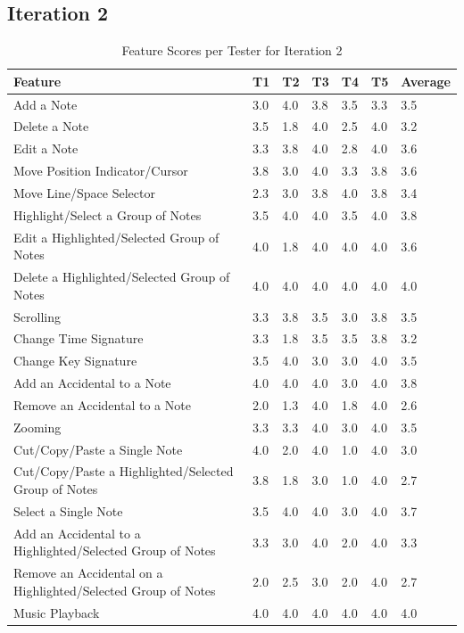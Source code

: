 		\subsection{Iteration 2}
			\begin{longtable}{|p{5cm}|R{.7cm}|R{.7cm}|R{.7cm}|R{.7cm}|R{.7cm}|R{1.5cm}|}
			  \caption{Feature Scores per Tester for Iteration 2} \label{tab:results-features-it2} \\ 
			  	\hline
			  	\textbf{Feature} & \textbf{T1} & \textbf{T2} & \textbf{T3} & \textbf{T4} & \textbf{T5} & \textbf{Average} \\ \hline
				Add a Note 																							& 3.0 & 4.0 & 3.8 & 3.5 & 3.3 & 3.5 \\ \hline
				Delete a Note 																						& 3.5 & 1.8 & 4.0 & 2.5 & 4.0 & 3.2 \\ \hline
				Edit a Note 																							& 3.3 & 3.8 & 4.0 & 2.8 & 4.0 & 3.6 \\ \hline
				Move Position Indicator/Cursor 															& 3.8 & 3.0 & 4.0 & 3.3 & 3.8 & 3.6 \\ \hline
				Move Line/Space Selector 																	& 2.3 & 3.0 & 3.8 & 4.0 & 3.8 & 3.4 \\ \hline
				Highlight/Select a Group of Notes 														& 3.5 & 4.0 & 4.0 & 3.5 & 4.0 & 3.8 \\ \hline
				Edit a Highlighted/Selected Group of Notes 										& 4.0 & 1.8 & 4.0 & 4.0 & 4.0 & 3.6 \\ \hline
				Delete a Highlighted/Selected Group of Notes 									& 4.0 & 4.0 & 4.0 & 4.0 & 4.0 & 4.0 \\ \hline
				Scrolling																								& 3.3 & 3.8 & 3.5 & 3.0 & 3.8 & 3.5 \\ \hline
				Change Time Signature 																		& 3.3 & 1.8 & 3.5 & 3.5 & 3.8 & 3.2 \\ \hline
				Change Key Signature 																		& 3.5 & 4.0 & 3.0 & 3.0 & 4.0 & 3.5 \\ \hline
				Add an Accidental to a Note 																& 4.0 & 4.0 & 4.0 & 3.0 & 4.0 & 3.8 \\ \hline
				Remove an Accidental to a Note 														& 2.0 & 1.3 & 4.0 & 1.8 & 4.0 & 2.6 \\ \hline
				Zooming 																								& 3.3 & 3.3 & 4.0 & 3.0 & 4.0 & 3.5 \\ \hline
				Cut/Copy/Paste a Single Note 															& 4.0 & 2.0 & 4.0 & 1.0 & 4.0 & 3.0 \\ \hline
				Cut/Copy/Paste a Highlighted/Selected Group of Notes 					& 3.8 & 1.8 & 3.0 & 1.0 & 4.0 & 2.7 \\ \hline
				Select a Single Note 																			& 3.5 & 4.0 & 4.0 & 3.0 & 4.0 & 3.7 \\ \hline
				Add an Accidental to a Highlighted/Selected Group of Notes 			& 3.3 & 3.0 & 4.0 & 2.0 & 4.0 & 3.3 \\ \hline
				Remove an Accidental on a Highlighted/Selected Group of Notes 	& 2.0 & 2.5 & 3.0 & 2.0 & 4.0 & 2.7 \\ \hline
				Music Playback 																					& 4.0 & 4.0 & 4.0 & 4.0 & 4.0 & 4.0 \\ \hline


\end{longtable}
